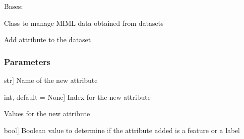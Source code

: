 \documentclass[letterpaper,10pt,english]{sphinxmanual}
\begin{document}
\begin{fulllineitems}
\label{\detokenize{data/_autosummary/miml.data.miml_dataset.MIMLDataset:miml.data.miml_dataset.MIMLDataset}}
\pysigstartsignatures
{}
\pysigstopsignatures
\sphinxAtStartPar
Bases: 

\sphinxAtStartPar
Class to manage MIML data obtained from datasets

\begin{fulllineitems}
\label{\detokenize{data/_autosummary/miml.data.miml_dataset.MIMLDataset:miml.data.miml_dataset.MIMLDataset.add_attribute}}
\pysigstartsignatures
{}
\pysigstopsignatures
\sphinxAtStartPar
Add attribute to the dataset


\subsubsection{Parameters}
\label{\detokenize{data/_autosummary/miml.data.miml_dataset.MIMLDataset:parameters}}\begin{description}
\sphinxlineitem{name}{[}str{]}
\sphinxAtStartPar
Name of the new attribute

\sphinxlineitem{position}{[}int, default = None{]}
\sphinxAtStartPar
Index for the new attribute

\sphinxAtStartPar
Values for the new attribute

\sphinxlineitem{feature}{[}bool{]}
\sphinxAtStartPar
Boolean value to determine if the attribute added is a feature or a label


\end{description}
\end{fulllineitems}
\end{fulllineitems}
\end{document}
